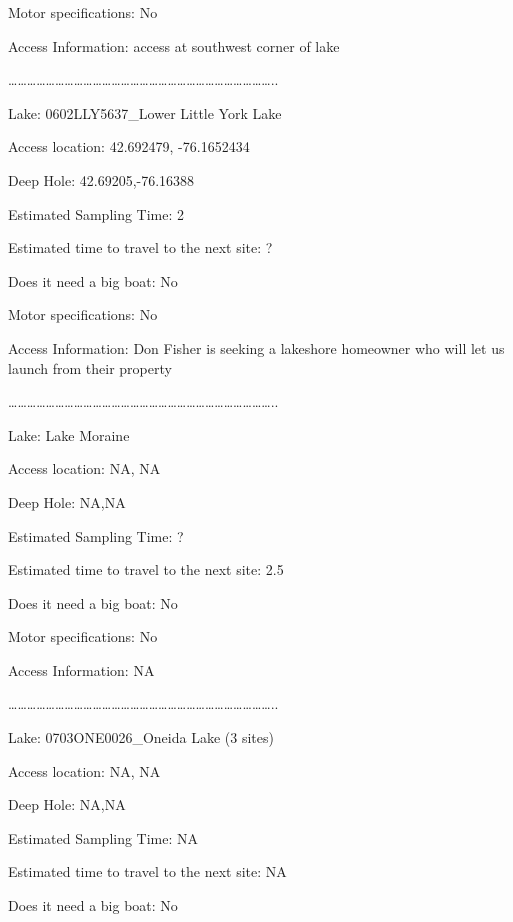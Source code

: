 \documentclass[]{article}
\begin{document}
Motor specifications: No

Access Information: access at southwest corner of lake

\ldots{}\ldots{}\ldots{}\ldots{}\ldots{}\ldots{}\ldots{}\ldots{}\ldots{}\ldots{}\ldots{}\ldots{}\ldots{}\ldots{}\ldots{}\ldots{}\ldots{}\ldots{}\ldots{}\ldots{}\ldots{}\ldots{}\ldots{}\ldots{}\ldots{}\ldots{}\ldots{}\ldots{}..

Lake: 0602LLY5637\_Lower Little York Lake

Access location: 42.692479, -76.1652434

Deep Hole: 42.69205,-76.16388

Estimated Sampling Time: 2

Estimated time to travel to the next site: ?

Does it need a big boat: No

Motor specifications: No

Access Information: Don Fisher is seeking a lakeshore homeowner who will
let us launch from their property

\ldots{}\ldots{}\ldots{}\ldots{}\ldots{}\ldots{}\ldots{}\ldots{}\ldots{}\ldots{}\ldots{}\ldots{}\ldots{}\ldots{}\ldots{}\ldots{}\ldots{}\ldots{}\ldots{}\ldots{}\ldots{}\ldots{}\ldots{}\ldots{}\ldots{}\ldots{}\ldots{}\ldots{}..

Lake: Lake Moraine

Access location: NA, NA

Deep Hole: NA,NA

Estimated Sampling Time: ?

Estimated time to travel to the next site: 2.5

Does it need a big boat: No

Motor specifications: No

Access Information: NA

\ldots{}\ldots{}\ldots{}\ldots{}\ldots{}\ldots{}\ldots{}\ldots{}\ldots{}\ldots{}\ldots{}\ldots{}\ldots{}\ldots{}\ldots{}\ldots{}\ldots{}\ldots{}\ldots{}\ldots{}\ldots{}\ldots{}\ldots{}\ldots{}\ldots{}\ldots{}\ldots{}\ldots{}..

Lake: 0703ONE0026\_Oneida Lake (3 sites)

Access location: NA, NA

Deep Hole: NA,NA

Estimated Sampling Time: NA

Estimated time to travel to the next site: NA

Does it need a big boat: No
\end{document}
